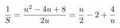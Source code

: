 \documentclass[preview]{standalone}
\begin{document}
\begin{align*}
\special{dvisvgm:raw <g id='unique000'>}\frac1S=\frac{u^2-4u+8}{2u}=\frac u2-2+\frac4u\special{dvisvgm:raw </g>}
\end{align*}
\end{document}
